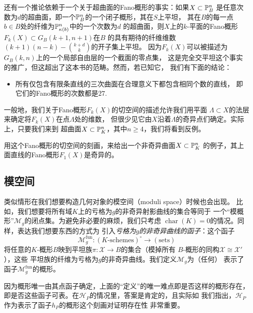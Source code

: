 
还有一个推论依赖于一个关于超曲面的Fano概形的事实：如果$X\subset \P_B^n$
是任意次数为$d$的超曲面，即一个$\P_B^n$的一个闭子概形，其在$S$上平坦，
其在$B$的每一点$b\in B$处的纤维为$\P_{\kappa(b)}^n$中的一个次数为$d$
的超曲面，则$X$上的$k$-平面的Fano概形$F_k(X)\subset G_B(k+1,n+1)$在$B$
的具有期待的纤维维数$(k+1)(n-k)-{k+d\choose k}$的开子集上平坦。
因为$F_k(X)$可以被描述为$G_B(k,n)$上的一个局部自由层的一个截面的零点集，
这是完全交平坦这个事实的推广，但这超出了这本书的范畴。然而，若已知它，
我们有下面的结论：

\begin{itemize}
\item 所有仅包含有限条直线的三次曲面在合理意义下都包含相同个数的直线，
即它们的Fano概形的次数都是$27$.
\end{itemize}

一般地，我们关于Fano概形$F_k(X)$的切空间的描述允许我们用平面
$\Lambda\subset X$的法层来确定将$F_k(X)$在点$\Lambda$处的维数，
但很少见它由$X$沿着$\Lambda$的奇异点们确定。实际上，只要我们来到
超曲面$X\subset \P_K^n$，其中$n\geq 4$，我们将看到反例。

\begin{exe}\label{exe:6.40}
    用这个Fano概形的切空间的刻画，来给出一个非奇异曲面$X\subset \P_K^n$
    的例子，其上面直线的Fano概形$F_1(X)$是奇异的。
\end{exe}

\subsection{模空间}\label{s:6.2.4}

类似情形在我们想要构造几何对象的模空间（moduli space）时候也会出现。
比如，我们想要将所有域$K$上的亏格为$g$的非奇异射影曲线的集合等同于
一个“模概形”$\mathscr M_g$的闭点集。为避免非必要的麻烦，我们只考虑
$\operatorname{char}(K)=0$的情况。同样，表达我们想要东西的方式为
引入\emph{亏格为$g$的非奇异曲线的函子}：这个函子
\[
    \mathscr M_g^{\text{fun}}:(\text{$K$-schemes})^\circ \to 
    (\text{sets})
\]
将任意的$K$-概形$B$映到平坦族$\pi:\mathscr X\to B$的集合（模掉所有
$B$-概形的同构$\mathscr X\cong \mathscr X'$），这些
平坦族的纤维为亏格为$g$的非奇异曲线。我们定义$\mathscr M_g$为（任何）
表示了函子$\mathscr M_g^{\text{fun}}$的概形。

因为概形唯一由其点函子确定，上面的“定义”的唯一难点即是否这样的概形存在，
即是否这些函子可表。在$\mathscr H_P$的情况里，答案是肯定的，且实际如
我们指出，$\mathscr H_P$作为表示了函子$h_P$的概形这个刻画对证明存在性
非常重要。

